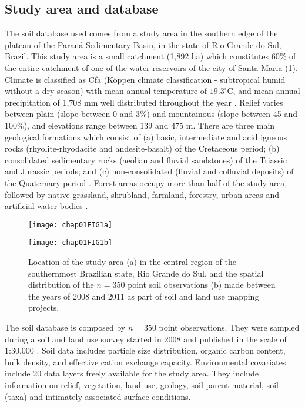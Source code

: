 \subsection{Study area and database}

The soil database used comes from a study area in the southern edge of the 
plateau of the Paraná Sedimentary Basin, in the state of Rio Grande do Sul, 
Brazil. This study area is a small catchment (1,892 ha) which constitutes 60\% 
of the entire catchment of one of the water reservoirs of the city of Santa 
Maria (\ref{fig:location-intro}). Climate is classified as Cfa (Köppen climate 
classification - subtropical humid without a dry season) with mean annual 
temperature of $19.3^{\circ}$C, and mean annual precipitation of 1,708 mm well 
distributed throughout the year \cite{Maluf2000}. Relief varies between plain 
(slope between 0 and 3\%) and mountainous (slope between 45 and 100\%), and 
elevations range between 139 and 475 m. There are three main geological 
formations which consist of (a) basic, intermediate and acid igneous rocks 
(rhyolite-rhyodacite and andesite-basalt) of the Cretaceous period; (b) 
consolidated sedimentary rocks (aeolian and fluvial sandstones) of the Triassic
and Jurassic periods; and (c) non-consolidated (fluvial and colluvial deposits)
of the Quaternary period \cite{GasparettoEtAl1988, MacielFilho1990, Sartori2009}.
Forest areas occupy more than half of the study area, followed by native 
grassland, shrubland, farmland, forestry, urban areas and artificial water 
bodies \cite{SamuelRosaEtAl2011a}.

\begin{figure}[!ht]
    \centering
    \begin{minipage}[b]{95mm}
      \subcaption{}
      \label{fig:brazil}
      \centering
      \texttt{[image: chap01FIG1a]}
    \end{minipage}
    \begin{minipage}[b]{95mm}
      \subcaption{}
      \label{fig:points}
      \centering
      \texttt{[image: chap01FIG1b]}
    \end{minipage}
  \caption{Location of the study area (a) in the central region of the 
  southernmost Brazilian state, Rio Grande do Sul, and the spatial distribution 
  of the $n=350$ point soil observations (b) made between the years of 2008 and
  2011 as part of soil and land use mapping projects.}
  \label{fig:location-intro}
\end{figure}

The soil database is composed by $n=350$ point observations. They were sampled 
during a soil and land use survey started in 2008 and published in the scale of
1:30,000 \cite{SamuelRosaEtAl2011a, MiguelEtAl2012}. Soil data includes 
particle size distribution, organic carbon content, bulk density, and effective 
cation exchange capacity. Environmental covariates include 20 data layers freely
available for the study area. They include information on relief, vegetation, 
land use, geology, soil parent material, soil (taxa) and intimately-associated 
surface conditions.


